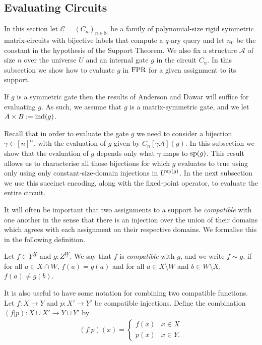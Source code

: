 \documentclass[../paper.tex]{subfiles}
\begin{document}
 \subsection {Evaluating Circuits}
 In this section let $\mathcal{C} = (C_n)_{n \in \mathbb{N}}$ be a family of
 polynomial-size rigid symmetric matrix-circuits with bijective labels that compute a $q$-ary query
 and let $n_0$ be the constant in the hypothesis of the Support Theorem. We also
 fix a structure $\mathcal{A}$ of size $n$ over the universe $U$ and an internal
 gate $g$ in the circuit $C_n$. In this subsection we show how to evaluate $g$ in
 $\text{\upshape FPR}$ for a given assignment to its support.

 If $g$ is a symmetric gate then the results of Anderson and Dawar \cite{AndersonD17}
 will suffice for evaluating $g$. As such, we assume that $g$ is a
 matrix-symmetric gate, and we let $A \times B :=
 \text{\upshape ind}(g)$.

 Recall that in order to evaluate the gate $g$ we need to consider a bijection
 $\gamma \in [n]^{\underline{U}}$, with the evaluation of $g$ given by
 $C_n[\gamma \mathcal{A}](g)$. In this subsection we show that the evaluation of
 $g$ depends only what $\gamma$ maps to $\text{sp}(g)$. This result allows us to
 characterise all those bijections for which $g$ evaluates to true using only
 using only constant-size-domain injections in $U^{\text{sp}(g)}$. In the next
 subsection we use this succinct encoding, along with the fixed-point operator,
 to evaluate the entire circuit.
 
 It will often be important that two assignments to a support be
 \emph{compatible} with one another in the sense that there is an injection over
 the union of their domains which agrees with each assignment on their
 respective domains. We formalise this in the following definition.

\begin{definition}
  Let $f \in Y^{\underline{X}}$ and $g : Z^{\underline{W}}$. We say that $f$ is
  \emph{compatible} with $g$, and we write $f \sim g$, if for all $a \in X \cap
  W$, $f(a) = g(a)$ and for all $a \in X \setminus W$ and $b \in W \setminus X$,
  $f(a) \neq g(b)$.
\end{definition}

It is also useful to have some notation for combining two compatible functions.
Let $f : X \rightarrow Y$ and $p: X' \rightarrow Y'$ be compatible injections.
Define the combination $(f | p): X \cup X' \rightarrow Y \cup Y'$ by
\begin{align*}
  (f \vert p) (x) =
  \begin{cases}
    f (x) & x \in X \\
    p (x) & x \in Y.
  \end{cases}
\end{align*}
\end{document}
